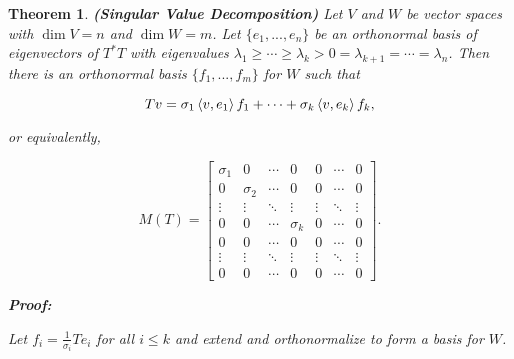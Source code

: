 \documentclass{article}
\theoremstyle{colontheorem}
\newtheorem{theorem}{Theorem}[section]
\newenvironment{Theorem}
{
	\begin{mdframed}[backgroundcolor=TheoremOrange!10]
	\begin{theorem}
}
{
	\end{theorem}
	\end{mdframed}
	
	\vspace{.15in}
}
\newenvironment{Proof}
{
	\begin{mdframed}[backgroundcolor=ProofPurple!10]
	\textbf{Proof:}%
}
{
	\end{mdframed}
	
	\vspace{.085in}
}
\begin{document}
\begin{Theorem}
	
	\textbf{(Singular Value Decomposition)} Let $V$ and $W$ be vector spaces with $\dim V = n$ and $\dim W = m$. Let $\{e_1, ..., e_n\}$ be an orthonormal basis of eigenvectors of $T^* T$ with eigenvalues $\lambda_1 \geq \cdots \geq \lambda_k > 0 = \lambda_{k+1} = \cdots = \lambda_n$. Then there is an orthonormal basis $\{f_1, ..., f_m\}$ for $W$ such that
	
	$$
		Tv = \sigma_1 \left< v, e_1 \right> f_1 + \cdots + \sigma_k \left< v, e_k \right> f_k \textnormal{,}
	$$
	
	or equivalently,
	
	$$
		M(T) = \begin{bmatrix}
			\sigma_1 & 0 & \cdots & 0 & 0 & \cdots & 0\\
			0 & \sigma_2 & \cdots & 0 & 0 & \cdots & 0\\
			\vdots & \vdots & \ddots & \vdots & \vdots & \ddots & \vdots\\
			0 & 0 & \cdots & \sigma_k & 0 & \cdots & 0\\
			0 & 0 & \cdots & 0 & 0 & \cdots & 0\\
			\vdots & \vdots & \ddots & \vdots & \vdots & \ddots & \vdots\\
			0 & 0 & \cdots & 0 & 0 & \cdots & 0
		\end{bmatrix}.
	$$
	
	\begin{Proof}
		Let $f_i = \frac{1}{\sigma_i}Te_i$ for all $i \leq k$ and extend and orthonormalize to form a basis for $W$.
		
	\end{Proof}
	
\end{Theorem}
\end{document}

